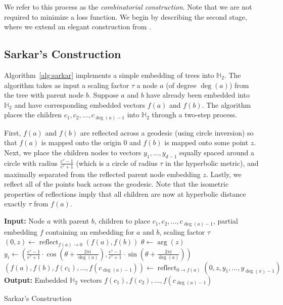 We refer to this process as the \emph{combinatorial construction}. Note that we are not required to minimize a loss function. We begin by describing the second stage, where we extend an elegant construction from \citet{sarkar}. 

\subsection{Sarkar's Construction}
Algorithm~\ref{alg:sarkar} implements a simple embedding of trees into $\mathbb{H}_2$. The algorithm takes as input a scaling factor $\tau$ a node $a$ (of degree $\operatorname{deg}(a)$) from the tree with parent node $b$. Suppose $a$ and $b$ have already been embedded into $\mathbb{H}_2$ and have corresponding embedded vectors $f(a)$ and $f(b)$. The algorithm places the children $c_1, c_2, \ldots, c_{\operatorname{deg}(a)-1}$ into $\mathbb{H}_2$ through a two-step process. 

First, $f(a)$ and $f(b)$ are reflected across a geodesic (using circle inversion) so
that $f(a)$ is mapped onto the origin $0$ and $f(b)$ is mapped onto some point $z$.
Next, we place the children nodes to vectors $y_1, \ldots, y_{d-1}$ equally spaced around a circle with radius $\frac{e^\tau-1}{e^\tau+1}$ (which is a circle of radius $\tau$ in the hyperbolic metric), and maximally separated from the reflected parent node embedding $z$. Lastly, we reflect all of the points back across the geodesic. 
Note that the isometric properties of reflections imply that all children are now at hyperbolic distance exactly $\tau$ from $f(a)$.

\begin{algorithm}[t]
\begin{algorithmic}[1]
\STATE \textbf{Input:} Node $a$ with parent $b$, children to place $c_1, c_2, \ldots, c_{\operatorname{deg}(a)-1}$, partial embedding $f$ containing an embedding for $a$ and $b$, scaling factor $\tau$
\STATE $(0, z) \leftarrow \operatorname{reflect}_{f(a) \rightarrow 0}(f(a),f(b))$ %
\STATE $\theta \leftarrow \operatorname{arg}(z)$ \hspace{2em} 
\STATE $y_i \leftarrow \left(\frac{e^\tau-1}{e^\tau+1} \cdot \cos\left(\theta + \frac{2\pi i}{\operatorname{deg}(a)} \right) , \frac{e^\tau-1}{e^\tau+1} \cdot \sin\left(\theta+\frac{2\pi i}{\operatorname{deg}(a)}\right) \right)$ %
\ENDFOR
\STATE $(f(a), f(b), f(c_1),\ldots,f(c_{\operatorname{deg}(a)-1})) \leftarrow \operatorname{reflect}_{0 \rightarrow f(a)}(0, z, y_1, \ldots, y_{\operatorname{deg}(x)-1})$
\STATE \textbf{Output:} Embedded $\mathbb{H}_2$ vectors $f(c_1), f(c_2), \ldots, f(c_{\operatorname{deg}(a)-1})$
\end{algorithmic}
\caption{Sarkar's Construction}
\label{alg:sarkar}
\end{algorithm}

